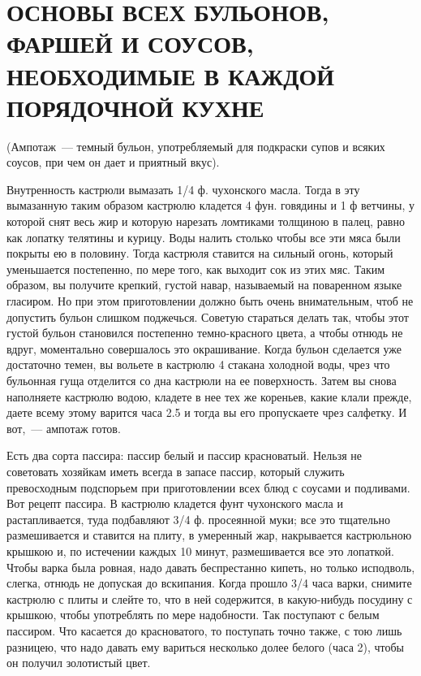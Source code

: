\section{ОСНОВЫ ВСЕХ БУЛЬОНОВ, ФАРШЕЙ И СОУСОВ, НЕОБХОДИМЫЕ В КАЖДОЙ ПОРЯДОЧНОЙ КУХНЕ}


(Ампотаж~--- темный бульон, употребляемый для подкраски супов и всяких соусов, при чем он дает и приятный вкус).

Внутренность кастрюли вымазать 1/4 ф. чухонского масла. Тогда в эту вымазанную таким образом кастрюлю кладется 4 фун. говядины и 1 ф ветчины, у которой снят весь жир и которую нарезать ломтиками толщиною в палец, равно как лопатку телятины и курицу. Воды налить столько чтобы все эти мяса были покрыты ею в половину. Тогда кастрюля ставится на сильный огонь, который уменьшается постепенно, по мере того, как выходит сок из этих мяс. Таким образом, вы получите крепкий, густой навар, называемый на поваренном языке гласиром. Но при этом приготовлении должно быть очень внимательным, чтоб не допустить бульон слишком поджечься. Советую стараться делать так, чтобы этот густой бульон становился постепенно темно-красного цвета, а чтобы отнюдь не вдруг, моментально совершалось это окрашивание. Когда бульон сделается уже достаточно темен, вы вольете в кастрюлю 4 стакана холодной воды, чрез что бульонная гуща отделится со дна кастрюли на ее поверхность. Затем вы снова наполняете кастрюлю водою, кладете в нее тех же кореньев, какие клали прежде, даете всему этому варится часа 2.5 и тогда вы его пропускаете чрез салфетку. И вот,~--- ампотаж готов.


Есть два сорта пассира: пассир белый и пассир красноватый. Нельзя не советовать хозяйкам иметь всегда в запасе пассир, который служить превосходным подспорьем при приготовлении всех блюд с соусами и подливами. Вот рецепт пассира. В кастрюлю кладется фунт чухонского масла и растапливается, туда подбавляют 3/4 ф. просеянной муки; все это тщательно размешивается и ставится на плиту, в умеренный жар, накрывается кастрюльною крышкою и, по истечении каждых 10 минут, размешивается все это лопаткой. Чтобы варка была ровная, надо давать беспрестанно кипеть, но только исподволь, слегка, отнюдь не допуская до вскипания. Когда прошло 3/4 часа варки, снимите кастрюлю с плиты и слейте то, что в ней содержится, в какую-нибудь посудину с крышкою, чтобы употреблять по мере надобности. Так поступают с белым пассиром. Что касается до красноватого, то поступать точно также, с тою лишь разницею, что надо давать ему вариться несколько долее белого (часа 2), чтобы он получил золотистый цвет.

